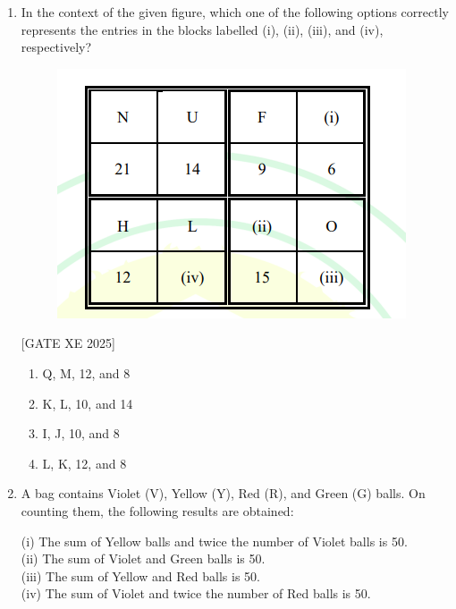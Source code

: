 \documentclass[journal,12pt,onecolumn]{IEEEtran}
\theoremstyle{remark}
\begin{document}
\begin{enumerate}
\begin{multicols}{2}
\begin{enumerate}
\item ₹ 604.8; 10\%
\item ₹ 504; 20\%
\item ₹ 604.8; 12\%
\item ₹ 720; 15\%
\end{enumerate}
\end{multicols}

\item In the context of the given figure, which one of the following options correctly represents the entries in the blocks labelled (i), (ii), (iii), and (iv), respectively?
\begin{figure}[H]
    \centering
    \includegraphics[width=0.5\columnwidth]{figs/fig1.png}
    \caption{}
    \label{fig:placeholder}
    
\end{figure}
\hfill [GATE XE 2025]

\begin{multicols}{2}
\begin{enumerate}
\item Q, M, 12, and 8
\item K, L, 10, and 14
\item I, J, 10, and 8
\item L, K, 12, and 8
\end{enumerate}
\end{multicols}

\item A bag contains Violet (V), Yellow (Y), Red (R), and Green (G) balls. On counting them, the following results are obtained:  

(i) The sum of Yellow balls and twice the number of Violet balls is 50.  \\
(ii) The sum of Violet and Green balls is 50.  \\
(iii) The sum of Yellow and Red balls is 50.  \\
(iv) The sum of Violet and twice the number of Red balls is 50. \\ 




\end{enumerate}
\end{document}
